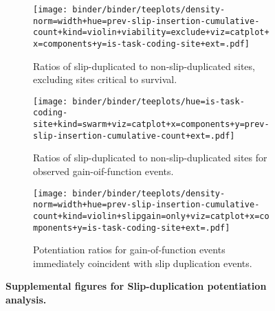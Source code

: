 \begin{figure*}

\begin{subfigure}{0.5\textwidth}
\texttt{[image: binder/binder/teeplots/density-norm=width+hue=prev-slip-insertion-cumulative-count+kind=violin+viability=exclude+viz=catplot+x=components+y=is-task-coding-site+ext=.pdf]}
\caption{%
\footnotesize
Ratios of slip-duplicated to non-slip-duplicated sites, excluding sites critical to survival.
}
\end{subfigure}%
\begin{subfigure}{0.5\textwidth}
\texttt{[image: binder/binder/teeplots/hue=is-task-coding-site+kind=swarm+viz=catplot+x=components+y=prev-slip-insertion-cumulative-count+ext=.pdf]}
\caption{%
\footnotesize
Ratios of slip-duplicated to non-slip-duplicated sites for observed gain-oif-function events.
}
\end{subfigure}

\begin{subfigure}{0.5\textwidth}
\texttt{[image: binder/binder/teeplots/density-norm=width+hue=prev-slip-insertion-cumulative-count+kind=violin+slipgain=only+viz=catplot+x=components+y=is-task-coding-site+ext=.pdf]}
\caption{%
\footnotesize
Potentiation ratios for gain-of-function events immediately coincident with slip duplication events.
}
\end{subfigure}

\caption{%
\textbf{Supplemental figures for Slip-duplication potentiation analysis.}
}
\label{fig:potentiation-supp}
\end{figure*}



